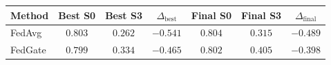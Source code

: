 \begin{tabular}{lcccccc}
\toprule
Method & Best S0 & Best S3 & $\Delta_{\mathrm{best}}$ & Final S0 & Final S3 & $\Delta_{\mathrm{final}}$ \\
\midrule
FedAvg & $0.803$ & $0.262$ & $-0.541$ & $0.804$ & $0.315$ & $-0.489$ \\
FedGate & $0.799$ & $0.334$ & $-0.465$ & $0.802$ & $0.405$ & $-0.398$ \\
\bottomrule
\end{tabular}
